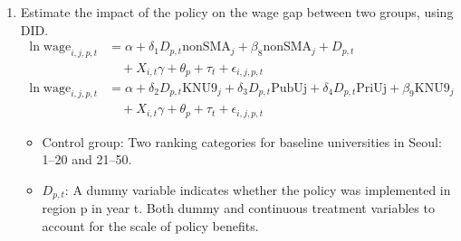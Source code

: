 \documentclass[aspectratio=169,xcolor=dvipsnames,handout]{beamer}
\begin{document}
\begin{frame}[allowframebreaks]
\begin{enumerate}[<+->]
\begin{itemize}[<+->]
        \end{itemize}
    \framebreak%
        \item Estimate the impact of the policy on the wage gap between two groups, using DID.%
            \begin{align}
                \ln{\text{wage}}_{i,j,p,t} &= \alpha + \delta_1 D_{p,t} \text{nonSMA}_j + \beta_8 \text{nonSMA}_j + D_{p,t} \\ \nonumber
                    &\quad + X_{i,t} \gamma + \theta_p + \tau_t + \epsilon_{i,j,p,t} \\
                \ln{\text{wage}}_{i,j,p,t} &= \alpha + \delta_2 D_{p,t} \text{KNU9}_j + \delta_3 D_{p,t} \text{PubUj} 
                    + \delta_4 D_{p,t} \text{PriUj} + \beta_9 \text{KNU9}_j \\
                    &\quad + X_{i,t} \gamma + \theta_p + \tau_t + \epsilon_{i,j,p,t} \nonumber
            \end{align}
            \begin{itemize}[<+->]
                \item Control group: Two ranking categories for baseline universities in Seoul: 1--20 and 21--50.
                \item $D_{p,t}$: A dummy variable indicates whether the policy was implemented in region p in year t. Both dummy and continuous treatment variables to account for the scale of policy benefits.
            \end{itemize}
    \end{enumerate}
\end{frame}
\end{document}
